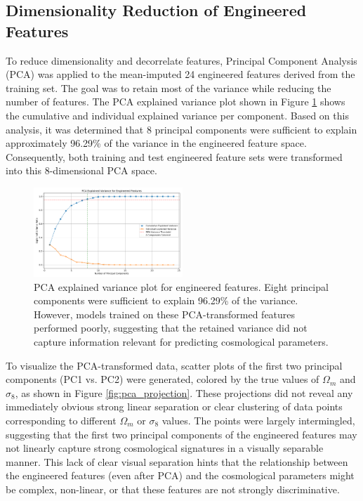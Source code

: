 \documentclass[twocolumn]{aastex631}
\begin{document}
\subsection{Dimensionality Reduction of Engineered Features}

To reduce dimensionality and decorrelate features, Principal Component Analysis (PCA) was applied to the mean-imputed 24 engineered features derived from the training set. The goal was to retain most of the variance while reducing the number of features. The PCA explained variance plot shown in Figure \ref{fig:pca_explained_variance} shows the cumulative and individual explained variance per component. Based on this analysis, it was determined that 8 principal components were sufficient to explain approximately 96.29\% of the variance in the engineered feature space. Consequently, both training and test engineered feature sets were transformed into this 8-dimensional PCA space.

\begin{figure}[h!]
    \centering
    \includegraphics[width=0.5\textwidth]{../input_files/plots/pca_explained_variance_plot_1_20250527-134016.png}
    \caption{PCA explained variance plot for engineered features. Eight principal components were sufficient to explain 96.29\% of the variance. However, models trained on these PCA-transformed features performed poorly, suggesting that the retained variance did not capture information relevant for predicting cosmological parameters.}
    \label{fig:pca_explained_variance}
\end{figure}

To visualize the PCA-transformed data, scatter plots of the first two principal components (PC1 vs. PC2) were generated, colored by the true values of $\Omega_m$ and $\sigma_8$, as shown in Figure \ref{fig:pca_projection}. These projections did not reveal any immediately obvious strong linear separation or clear clustering of data points corresponding to different $\Omega_m$ or $\sigma_8$ values. The points were largely intermingled, suggesting that the first two principal components of the engineered features may not linearly capture strong cosmological signatures in a visually separable manner. This lack of clear visual separation hints that the relationship between the engineered features (even after PCA) and the cosmological parameters might be complex, non-linear, or that these features are not strongly discriminative.
\end{document}
